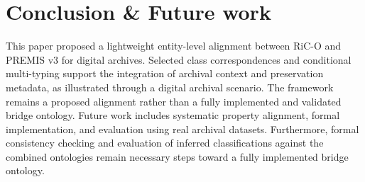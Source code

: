 \documentclass[runningheads]{llncs}
\begin{document}
\section{Conclusion \& Future work}
\label{sec:conclusion}
This paper proposed a lightweight entity-level alignment between RiC-O and PREMIS v3 for digital archives. Selected class correspondences and conditional multi-typing support the integration of archival context and preservation metadata, as illustrated through a digital archival scenario. The framework remains a proposed alignment rather than a fully implemented and validated bridge ontology. Future work includes systematic property alignment, formal implementation, 
and evaluation using real archival datasets.
Furthermore, formal consistency checking and evaluation of inferred classifications against the combined ontologies remain necessary steps toward a fully implemented bridge ontology.
%
%
 
 
\end{document}
